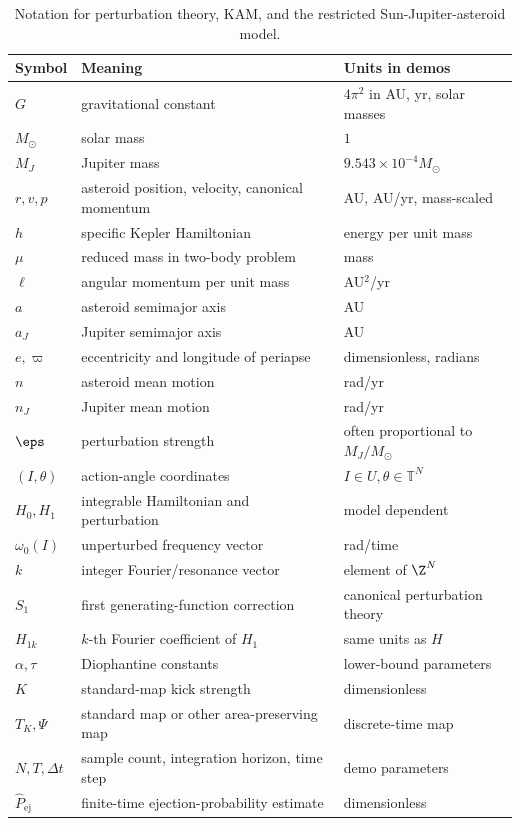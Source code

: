 \begin{table}[htbp]
\centering
\caption{Notation for perturbation theory, KAM, and the restricted
Sun-Jupiter-asteroid model.}
\label{tab:perturbation-chaos-notation}
\small
\begin{tabular}{p{}p{}p{}}
\toprule
Symbol & Meaning & Units in demos\\
\midrule
\(G\) & gravitational constant & \(4\pi^2\) in AU, yr, solar masses\\
\(M_\odot\) & solar mass & \(1\)\\
\(M_J\) & Jupiter mass & \(9.543\times 10^{-4}M_\odot\)\\
\(r,v,p\) & asteroid position, velocity, canonical momentum & AU, AU/yr, mass-scaled\\
\(h\) & specific Kepler Hamiltonian & energy per unit mass\\
\(\mu\) & reduced mass in two-body problem & mass\\
\(\ell\) & angular momentum per unit mass & AU\(^2\)/yr\\
\(a\) & asteroid semimajor axis & AU\\
\(a_J\) & Jupiter semimajor axis & AU\\
\(e,\varpi\) & eccentricity and longitude of periapse & dimensionless, radians\\
\(n\) & asteroid mean motion & rad/yr\\
\(n_J\) & Jupiter mean motion & rad/yr\\
\(\eps\) & perturbation strength & often proportional to \(M_J/M_\odot\)\\
\((I,\theta)\) & action-angle coordinates & \(I\in U,\theta\in\mathbb T^N\)\\
\(H_0,H_1\) & integrable Hamiltonian and perturbation & model dependent\\
\(\omega_0(I)\) & unperturbed frequency vector & rad/time\\
\(k\) & integer Fourier/resonance vector & element of \(\Z^N\)\\
\(S_1\) & first generating-function correction & canonical perturbation theory\\
\(H_{1k}\) & \(k\)-th Fourier coefficient of \(H_1\) & same units as \(H\)\\
\(\alpha,\tau\) & Diophantine constants & lower-bound parameters\\
\(K\) & standard-map kick strength & dimensionless\\
\(T_K,\Psi\) & standard map or other area-preserving map & discrete-time map\\
\(N,T,\Delta t\) & sample count, integration horizon, time step & demo parameters\\
\(\widehat P_{\mathrm{ej}}\) & finite-time ejection-probability estimate & dimensionless\\
\bottomrule
\end{tabular}
\end{table}

